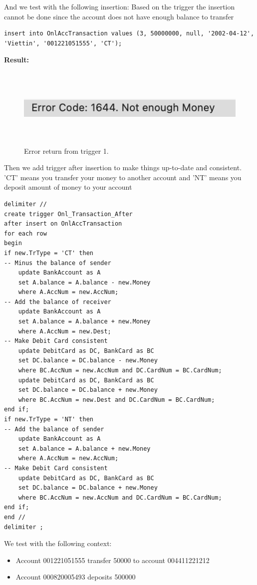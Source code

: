 \documentclass[12pt,a4paper]{article}
\begin{document}
And we test with the following insertion:
Based on the trigger the insertion cannot be done since the account does not have enough balance to transfer
\begin{verbatim}
insert into OnlAccTransaction values (3, 50000000, null, '2002-04-12',
'Viettin', '001221051555', 'CT');
\end{verbatim}

\textbf{Result:}
 \begin{figure}[H]
        \centering
        \includegraphics[width=5in,height=1.5in]{Picture/Trigger1Result.png}
        \caption{Error return from trigger 1.}
\end{figure}

Then we add trigger after insertion to make things up-to-date and consistent. 'CT' means you transfer your money to another account and 'NT' means you deposit amount of money to your account

\begin{verbatim}
delimiter //
create trigger Onl_Transaction_After 
after insert on OnlAccTransaction
for each row 
begin 
if new.TrType = 'CT' then
-- Minus the balance of sender
	update BankAccount as A
	set A.balance = A.balance - new.Money 
    where A.AccNum = new.AccNum;
-- Add the balance of receiver  
    update BankAccount as A
	set A.balance = A.balance + new.Money 
    where A.AccNum = new.Dest;
-- Make Debit Card consistent
    update DebitCard as DC, BankCard as BC
	set DC.balance = DC.balance - new.Money 
    where BC.AccNum = new.AccNum and DC.CardNum = BC.CardNum;
    update DebitCard as DC, BankCard as BC
	set DC.balance = DC.balance + new.Money 
    where BC.AccNum = new.Dest and DC.CardNum = BC.CardNum;
end if;
if new.TrType = 'NT' then
-- Add the balance of sender
	update BankAccount as A
	set A.balance = A.balance + new.Money 
    where A.AccNum = new.AccNum;
-- Make Debit Card consistent
    update DebitCard as DC, BankCard as BC
	set DC.balance = DC.balance + new.Money 
    where BC.AccNum = new.AccNum and DC.CardNum = BC.CardNum;
end if;
end //
delimiter ;
\end{verbatim}
\newpage
We test with the following context:
\begin{itemize}
    \item Account 001221051555 transfer 50000 to account 004411221212
    \item Account 000820005493 deposits 500000
\end{itemize}
\end{document}
